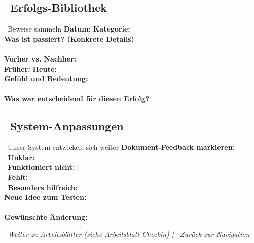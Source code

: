\subsection*{\faTrophy~Erfolgs-Bibliothek}
\label{sec:erfolge}

\begin{ctmmGreenBox}{\faBullseye~Beweise sammeln}
\textbf{Datum:}  \quad \textbf{Kategorie:}   \\[0.3cm]

\textbf{Was ist passiert? (Konkrete Details)}\\
\\[0.3cm]

\textbf{Vorher vs. Nachher:}\\
\textbf{Früher:}  \textbf{Heute:} \\[0.3cm]

\textbf{Gefühl und Bedeutung:}\\
\\[0.3cm]

\textbf{Was war entscheidend für diesen Erfolg?}\\
\end{ctmmGreenBox}

\subsection*{\faLightbulb~System-Anpassungen}

\begin{ctmmOrangeBox}{\faWrench~Unser System entwickelt sich weiter}
\textbf{Dokument-Feedback markieren:}\\
\faThumbtack~\textbf{Unklar:} \\
\faTimes~\textbf{Funktioniert nicht:} \\
\faPlus~\textbf{Fehlt:} \\
\faStar~\textbf{Besonders hilfreich:} \\[0.3cm]

\textbf{Neue Idee zum Testen:}\\
\\[0.3cm]

\textbf{Gewünschte Änderung:}\\
\end{ctmmOrangeBox}

\vspace{1cm}
\begin{center}
\textit{\textcolor{ctmmGreen}{\faChevronRight~Weiter zu Arbeitsblätter (siehe Arbeitsblatt-Checkin)} | \textcolor{ctmmBlue}{\faHome~Zurück zur Navigation}}
\end{center}
